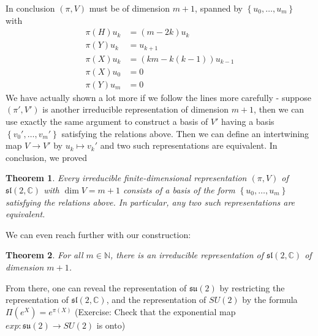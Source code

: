 \documentclass[11pt]{article}
\newtheorem{theorem}{Theorem}[section]
\newcommand{\bb}[1]{\mathbb{#1}}
\newcommand{\mf}[1]{\mathfrak{#1}}
\begin{document}
\noindent In conclusion $(\pi,V)$ must be of dimension $m+1$, spanned by $\left\{u_0, \dots, u_m\right\}$ with
\begin{align*}
\pi(H)u_k &= (m-2k)u_k\\
\pi(Y)u_k &= u_{k+1}\\
\pi(X)u_k &= (km-k(k-1))u_{k-1}\\
\pi(X)u_0 &= 0\\
\pi(Y)u_m &= 0
\end{align*}
We have actually shown a lot more if we follow the lines more carefully - suppose $(\pi',V')$ is another irreducible representation of dimension $m+1$, then we can use exactly the same argument to construct a basis of $V'$ having a basis $\left\{v_0', \dots, v_m'\right\}$ satisfying the relations above. Then we can define an intertwining map $V \to V'$ by $u_k \mapsto v_k'$ and two such representations are equivalent. In conclusion, we proved
\begin{theorem}
Every irreducible finite-dimensional representation $(\pi,V)$ of $\mf{sl}(2,\bb{C})$ with $\dim V = m+1$ consists of a basis of the form $\left\{u_0, \dots, u_m\right\}$ satisfying the relations above. In particular, any two such representations are equivalent.
\end{theorem}
We can even reach further with our construction:
\begin{theorem}
For all $m \in \bb{N}$, there is an irreducible representation of $\mf{sl}(2,\bb{C})$ of dimension $m+1$.
\end{theorem}
From there, one can reveal the representation of $\mf{su}(2)$ by restricting the representation of $\mf{sl}(2,\bb{C})$, and the representation of $SU(2)$ by the formula $\Pi(e^X) = e^{\pi(X)}$ (Exercise: Check that the exponential map $exp: \mf{su}(2) \to SU(2)$ is onto)
\end{document}
